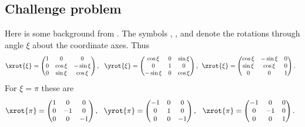 \documentclass[11pt,titlepage,fleqn]{article}
\begin{document}
\subsection*{Challenge problem}

Here is some background from \citet{TapeTape2013}. The symbols \xrot{\xi}, \yrot{\xi}, and \zrot{\xi} denote the rotations through angle $\xi$ about the coordinate axes. Thus
%
\begin{equation*}
\xrot{\xi}=\begin{small}\begin{pmatrix}   1 &     0   & 0\\
                                          0 & \cos\xi &-\sin\xi\\
                                          0 & \sin\xi & \cos\xi\end{pmatrix}\end{small},\:\:\:
\yrot{\xi}=\begin{small}\begin{pmatrix}\cos\xi & 0 &\sin\xi \\
                                       0       & 1 & 0      \\
                                      -\sin\xi & 0 & \cos\xi\end{pmatrix}\end{small},\:\:
\zrot{\xi}=\begin{small}\begin{pmatrix}   \cos\xi & -\sin\xi & 0 \\
                                          \sin\xi & \cos\xi & 0 \\
                                          0  & 0 & 1\end{pmatrix}\end{small}.\:\:\:
\end{equation*}
%
For $\xi = \pi$ these are
%
\begin{equation*}
\xrot{\pi}=\begin{small}\begin{pmatrix}   1 &     0   & 0\\
                                          0 & -1 & 0\\
                                          0 & 0 & -1\end{pmatrix}\end{small},\:\:\:
\yrot{\pi}=\begin{small}\begin{pmatrix}-1 & 0 & 0 \\
                                       0 & 1 & 0      \\
                                       0 & 0 & -1\end{pmatrix}\end{small},\:\:\;
\zrot{\pi}=\begin{small}\begin{pmatrix}   -1 & 0 & 0 \\
                                          0 & -1 & 0 \\
                                          0  & 0 & 1\end{pmatrix}\end{small}.\:\:\:
\label{eq:DefXxiYxiZxi}
\end{equation*}
\end{document}
